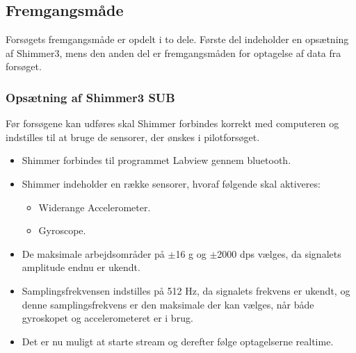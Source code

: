 \subsection{Fremgangsmåde}
Forsøgets fremgangsmåde er opdelt i to dele. Første del indeholder en opsætning af Shimmer3, mens den anden del er fremgangsmåden for optagelse af data fra forsøget.

\subsubsection{Opsætning af Shimmer3 SUB}
Før forsøgene kan udføres skal Shimmer forbindes korrekt med computeren og indstilles til at bruge de sensorer, der ønskes i pilotforsøget. \vspace{-3mm}
\begin{itemize}
	\item Shimmer forbindes til programmet Labview gennem bluetooth.
	\item Shimmer indeholder en række sensorer, hvoraf følgende skal aktiveres: 
	\begin{itemize}
		\item Widerange Accelerometer.
		\item Gyroscope.
	\end{itemize}
	\item De maksimale arbejdsområder på $\pm$16 g og $\pm$2000 dps vælges, da signalets amplitude endnu er ukendt.
	\item Samplingsfrekvensen indstilles på 512 Hz, da signalets frekvens er ukendt, og denne samplingsfrekvens er den maksimale der kan vælges, når både gyroskopet og accelerometeret er i brug.  
	\item Det er nu muligt at starte stream og derefter følge optagelserne realtime.
\end{itemize}

